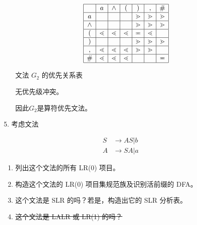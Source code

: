 \begin{enumerate}
\begin{enumerate}
            \begin{table}[H]
                \centering
                \begin{equation*}
                    \begin{array}{|c|c|c|c|c|c|c|}
                        \hline
                          & a & \wedge & ( & ) & , & \# \\
                        \hline
                        a & & & & \gtrdot & \gtrdot & \gtrdot \\
                        \hline
                        \wedge & & & & \gtrdot & \gtrdot & \gtrdot \\
                        \hline
                        ( & \lessdot & \lessdot & \lessdot & \eqcirc & \lessdot & \\
                        \hline
                        ) & & & & \gtrdot & \gtrdot & \gtrdot \\
                        \hline
                        , & \lessdot & \lessdot & \lessdot & \gtrdot & \gtrdot & \\
                        \hline
                        \# & \lessdot & \lessdot & \lessdot & & & \eqcirc \\
                        \hline
                    \end{array}
                \end{equation*}
                \caption{文法 $G_2$ 的优先关系表}
                \label{tab:G2F}
            \end{table}
        
            无优先级冲突。
            
            因此$G_2$是算符优先文法。
    
    \end{enumerate}
    
    \item[5.] 考虑文法
    
    \begin{align*}
        S & \to AS | b \\
        A & \to SA | a
    \end{align*}
    
    \begin{enumerate}
        \item 列出这个文法的所有 LR(0) 项目。
        \item 构造这个文法的 LR(0) 项目集规范族及识别活前缀的 DFA。
        \item 这个文法是 SLR 的吗？若是，构造出它的 SLR 分析表。
        \item \sout{这个文法是 LALR 或 LR(1) 的吗？}
    \end{enumerate}
    

\end{enumerate}
